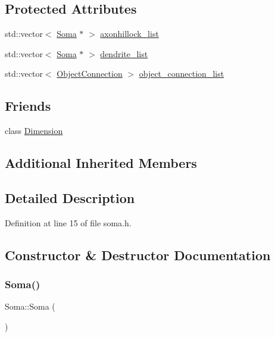 \subsection*{Protected Attributes}
\begin{DoxyCompactItemize}
\item 
std\+::vector$<$ \mbox{\hyperlink{class_soma}{Soma}} $\ast$ $>$ \mbox{\hyperlink{class_soma_af93902336cddb974b282aef8b7b4243c}{axonhillock\+\_\+list}}
\item 
std\+::vector$<$ \mbox{\hyperlink{class_soma}{Soma}} $\ast$ $>$ \mbox{\hyperlink{class_soma_ab2d13b0adf2d10c242df0b8e62bcc01a}{dendrite\+\_\+list}}
\item 
std\+::vector$<$ \mbox{\hyperlink{struct_soma_1_1_object_connection}{Object\+Connection}} $>$ \mbox{\hyperlink{class_soma_a84739acd533862b115bd5cbe56da6c98}{object\+\_\+connection\+\_\+list}}
\end{DoxyCompactItemize}
\subsection*{Friends}
\begin{DoxyCompactItemize}
\item 
class \mbox{\hyperlink{class_soma_aabae1fdc220bf040d4f5c2c057abfcf5}{Dimension}}
\end{DoxyCompactItemize}
\subsection*{Additional Inherited Members}


\subsection{Detailed Description}


Definition at line 15 of file soma.\+h.



\subsection{Constructor \& Destructor Documentation}
\mbox{\label{class_soma_abb9524743f65717d33797b45bff42441}} 
\subsubsection{\texorpdfstring{Soma()}{Soma()}\hspace{0.1cm}{\footnotesize\ttfamily [1/4]}}
{\footnotesize\ttfamily Soma\+::\+Soma (\begin{DoxyParamCaption}{ }\end{DoxyParamCaption})\hspace{0.3cm}{\ttfamily [inline]}}



